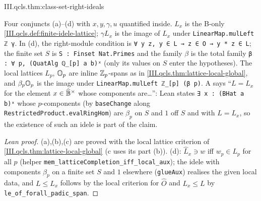 \begin{theorem}
\end{theorem}
\begin{tfformal}{III.qcls.thm:class-set-right-ideals}
\begin{tffidelity}
Four conjuncts (a)--(d) with $x,y,\gamma,u$ quantified inside. $L_x$ is the B-only \cref{III.qcls.def:finite-idele-lattice}; $\gamma L_x$ is the image of $L_x$ under \texttt{LinearMap.mulLeft ℤ γ}. In (d), the right-module condition is \texttt{∀ y z, y ∈ L → z ∈ O → y * z ∈ L}; the finite set $S$ is \texttt{S : Finset Nat.Primes} and the family $\beta$ is the total family \texttt{β : ∀ p, (QuatAlg ℚ\_[p] a b)ˣ} (only its values on $S$ enter the hypotheses). The local lattices $L_p$, $\mathbb{O}_p$ are inline $\mathbb{Z}_p$-spans as in \cref{III.qcls.thm:lattice-local-global}, and $\beta_p\mathbb{O}_p$ is the image under \texttt{LinearMap.mulLeft ℤ\_[p] (β p)}. A says ``$L=L_x$ for the element $x\in\widehat{\mathbb{B}}^\times$ whose components are\dots'': Lean states \texttt{∃ x : (BHat a b)ˣ} whose $p$-components (by \texttt{baseChange} along \texttt{RestrictedProduct.evalRingHom}) are $\beta_p$ on $S$ and $1$ off $S$ and with $L=L_x$, so the existence of such an idele is part of the claim.
\end{tffidelity}
\end{tfformal}
\begin{proof}[Lean proof]
(a),(b),(c) are proved with the local lattice criterion of \cref{III.qcls.thm:lattice-local-global} (c uses its part (b)). (d): $\hat L_x\ni w$ iff $w_p\in L_p$ for all $p$ (helper \texttt{mem\_latticeCompletion\_iff\_local\_aux}); the idele with components $\beta_p$ on a finite set $S$ and $1$ elsewhere (\texttt{glueAux}) realises the given local data, and $L\le L_x$ follows by the local criterion for $\hat O$ and $L_x\le L$ by \texttt{le\_of\_forall\_padic\_span}.
\end{proof}

